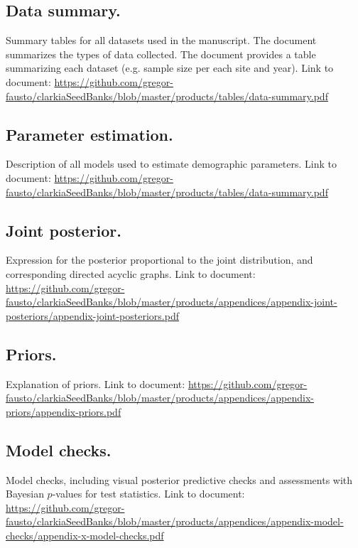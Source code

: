 \documentclass[12pt, oneside, titlepage]{article}   	%
\begin{document}
\subsection*{Data summary.} Summary tables for all datasets used in the manuscript. The document summarizes the types of data collected. The document provides a table summarizing each dataset (e.g. sample size per each site and year). Link to document: \url{https://github.com/gregor-fausto/clarkiaSeedBanks/blob/master/products/tables/data-summary.pdf}

\subsection*{Parameter estimation.} Description of all models used to estimate demographic parameters. Link to document: \url{https://github.com/gregor-fausto/clarkiaSeedBanks/blob/master/products/tables/data-summary.pdf}

\subsection*{Joint posterior.} Expression for the posterior proportional to the joint distribution, and corresponding directed acyclic graphs. Link to document: \url{https://github.com/gregor-fausto/clarkiaSeedBanks/blob/master/products/appendices/appendix-joint-posteriors/appendix-joint-posteriors.pdf}

\subsection*{Priors.} Explanation of priors. Link to document: \url{https://github.com/gregor-fausto/clarkiaSeedBanks/blob/master/products/appendices/appendix-priors/appendix-priors.pdf}

\subsection*{Model checks.} Model checks, including visual posterior predictive checks and assessments with Bayesian $p$-values for test statistics. Link to document: \url{https://github.com/gregor-fausto/clarkiaSeedBanks/blob/master/products/appendices/appendix-model-checks/appendix-x-model-checks.pdf}
\end{document}
